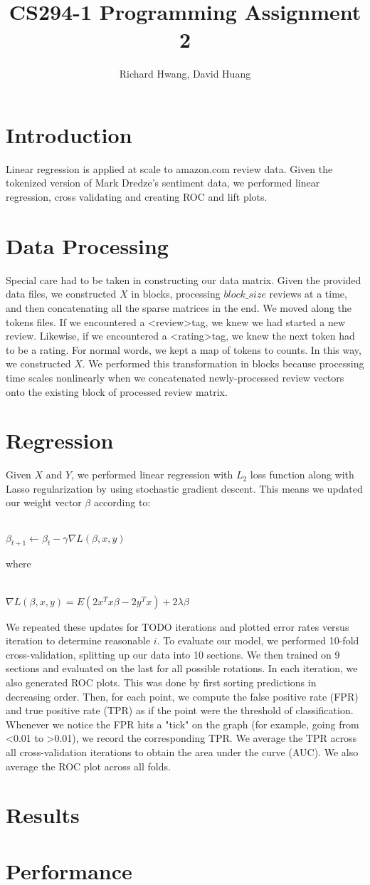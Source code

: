 \documentclass[11pt]{article}
\title{CS294-1 Programming Assignment 2}
\author{Richard Hwang, David Huang}
\begin{document}
\maketitle

\section{Introduction}
Linear regression is applied at scale to amazon.com review data.  Given the tokenized version of Mark Dredze's sentiment data, we performed linear regression, cross validating and creating ROC and lift plots.

\section{Data Processing}
Special care had to be taken in constructing our data matrix.  Given the provided data files, we constructed $X$ in blocks, processing $block\_size$ reviews at a time, and then concatenating all the sparse matrices in the end.  We moved along the tokens files.  If we encountered a \textless review\textgreater tag, we knew we had started a new review.  Likewise, if we encountered a \textless rating\textgreater tag, we knew the next token had to be a rating.  For normal words, we kept a map of tokens to counts.  In this way, we constructed $X$.  We performed this transformation in blocks because processing time scales nonlinearly when we concatenated newly-processed review vectors onto the existing block of processed review matrix.


\section{Regression}
Given $X$ and $Y$, we performed linear regression with $L_2$ loss function along with Lasso regularization by using stochastic gradient descent.  This means we updated our weight vector $\beta$ according to:\\\\
\centerline{$\beta_{t+1} \leftarrow \beta_{t} - \gamma \nabla L(\beta, x, y)$}
where\\\\
\centerline{$\nabla L(\beta, x, y) = E(2x^T x \beta - 2 y^T x) + 2 \lambda \beta$}
We repeated these updates for TODO iterations and plotted error rates versus iteration to determine reasonable $i$.  To evaluate our model, we performed 10-fold cross-validation, splitting up our data into 10 sections.  We then trained on 9 sections and evaluated on the last for all possible rotations.  In each iteration, we also generated ROC plots.  This was done by first sorting predictions in decreasing order.  Then, for each point, we compute the false positive rate (FPR) and true positive rate (TPR) as if the point were the threshold of classification.  Whenever we notice the FPR hits a "tick" on the graph (for example, going from <0.01 to >0.01), we record the corresponding TPR.  We average the TPR across all cross-validation iterations to obtain the area under the curve (AUC).    We also average the ROC plot across all folds.  

\section{Results}


\section{Performance}
\end{document}
